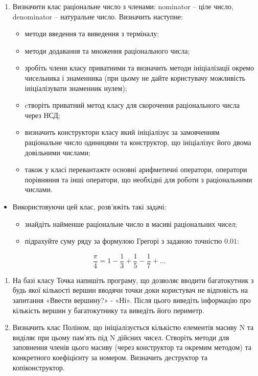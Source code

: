 \documentclass[]{article}
\begin{document}
\begin{enumerate}
\def\labelenumi{\arabic{enumi}.}
\item
  \protect\hypertarget{_Hlk65950041}{}{}Визначити клас раціональне число
  з членами: nominator -- ціле число, denominator -- натуральне число.
  Визначить наступне:

  \begin{itemize}
  \item
    методи введення та виведення з терміналу;
  \item
    методи додавання та множення раціонального числа;
  \item
    зробіть члени класу приватними та визначить методи ініціалізації
    окремо чисельника і знаменника (при цьому не дайте користувачу
    можливість ініціалізувати знаменник нулем);
  \item
    cтворіть приватний метод класу для скорочення раціонального числа
    через НСД;
  \item
    визначить конструктори класу який ініціалізує за замовченням
    раціональне число одиницями та конструктор, що ініціалізує його
    двома довільними числами;
  \item
    також у класі перевантажте основні арифметичні оператори, оператори
    порівняння та інші оператори, що необхідні для роботи з
    раціональними числами.
  \end{itemize}
\end{enumerate}

\begin{itemize}
\item
  Використовуючи цей клас, розв'яжіть такі задачі:

  \begin{itemize}
  \item
    знайдіть найменше раціональне число в масиві раціональних чисел;
  \item
    підрахуйте суму ряду за формулою Грегорі з заданою точністю
    \(0.01\):
  \end{itemize}
\end{itemize}

\[\frac{\pi}{4} = 1 - \frac{1}{3} + \frac{1}{5} - \frac{1}{7} + \ldots\]

\begin{enumerate}
\def\labelenumi{\arabic{enumi}.}
\item
  На базі класу Точка напишіть програму, що дозволяє вводити
  багатокутник з будь якої кількості вершин вводячи точки доки
  користувач не відповість на запитання «Ввести вершину?» - «Ні». Після
  цього виведіть інформацію про кількість вершин у багатокутнику та
  виведіть його периметр.
\item
  Визначить клас Поліном, що ініціалізується кількістю елементів масиву
  N та виділяє при цьому пам'ять під N дійсних чисел. Створіть методи
  для заповнення членів цього масиву (через конструктор та окремим
  методом) та конкретного коефіцієнту за номером. Визначить деструктор
  та копіконструктор.
\end{enumerate}
\end{document}
